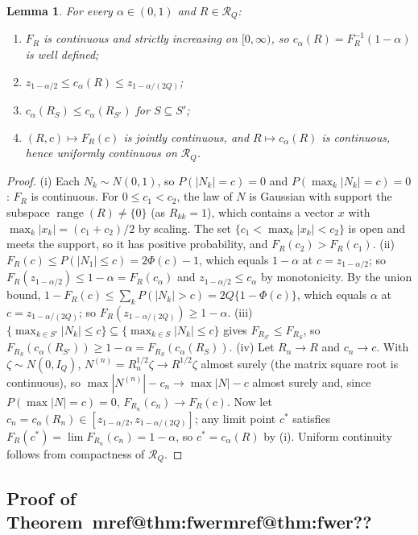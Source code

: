\documentclass[pdflatex,sn-mathphys-num,iicol]{sn-jnl}
\makeatletter
\theoremstyle{thmstyleone}
\newtheorem{lemma}[proposition]{Lemma}
\theoremstyle{thmstyletwo}
\theoremstyle{thmstylethree}
\newcommand{\Mref}[1]{\ifcsname mref@#1\endcsname\csname mref@#1\endcsname\else\textbf{??}\fi}
\makeatother
\begin{document}
\begin{lemma}\label{lem:crit}
For every $\alpha\in(0,1)$ and $R\in\mathcal R_Q$:
\begin{enumerate}
\item[(i)] $F_R$ is continuous and strictly increasing on $[0,\infty)$, so $c_\alpha(R)=F_R^{-1}(1-\alpha)$ is well defined;
\item[(ii)] $z_{1-\alpha/2}\le c_\alpha(R)\le z_{1-\alpha/(2Q)}$;
\item[(iii)] $c_\alpha(R_S)\le c_\alpha(R_{S'})$ for $S\subseteq S'$;
\item[(iv)] $(R,c)\mapsto F_R(c)$ is jointly continuous, and $R\mapsto c_\alpha(R)$ is continuous, hence uniformly continuous on $\mathcal R_Q$.
\end{enumerate}
\end{lemma}
\begin{proof}
(i) Each $N_k\sim N(0,1)$, so $P(|N_k|=c)=0$ and $P(\max_k|N_k|=c)=0$: $F_R$ is continuous. For $0\le c_1<c_2$, the law of $N$ is Gaussian with support the subspace $\operatorname{range}(R)\neq\{0\}$ (as $R_{kk}=1$), which contains a vector $x$ with $\max_k|x_k|=(c_1+c_2)/2$ by scaling. The set $\{c_1<\max_k|x_k|<c_2\}$ is open and meets the support, so it has positive probability, and $F_R(c_2)>F_R(c_1)$.
(ii) $F_R(c)\le P(|N_1|\le c)=2\Phi(c)-1$, which equals $1-\alpha$ at $c=z_{1-\alpha/2}$; so $F_R(z_{1-\alpha/2})\le1-\alpha=F_R(c_\alpha)$ and $z_{1-\alpha/2}\le c_\alpha$ by monotonicity. By the union bound, $1-F_R(c)\le\sum_kP(|N_k|>c)=2Q\{1-\Phi(c)\}$, which equals $\alpha$ at $c=z_{1-\alpha/(2Q)}$; so $F_R(z_{1-\alpha/(2Q)})\ge1-\alpha$.
(iii) $\{\max_{k\in S'}|N_k|\le c\}\subseteq\{\max_{k\in S}|N_k|\le c\}$ gives $F_{R_{S'}}\le F_{R_S}$, so $F_{R_S}(c_\alpha(R_{S'}))\ge1-\alpha=F_{R_S}(c_\alpha(R_S))$.
(iv) Let $R_n\to R$ and $c_n\to c$. With $\zeta\sim N(0,I_Q)$, $N^{(n)}=R_n^{1/2}\zeta\to R^{1/2}\zeta$ almost surely (the matrix square root is continuous), so $\max|N^{(n)}|-c_n\to\max|N|-c$ almost surely and, since $P(\max|N|=c)=0$, $F_{R_n}(c_n)\to F_R(c)$. Now let $c_n=c_\alpha(R_n)\in[z_{1-\alpha/2},z_{1-\alpha/(2Q)}]$; any limit point $c^\ast$ satisfies $F_R(c^\ast)=\lim F_{R_n}(c_n)=1-\alpha$, so $c^\ast=c_\alpha(R)$ by (i). Uniform continuity follows from compactness of $\mathcal R_Q$.
\end{proof}

\subsection{Proof of Theorem~\Mref{thm:fwer}}\label{si:testing-fwer}
\end{document}
